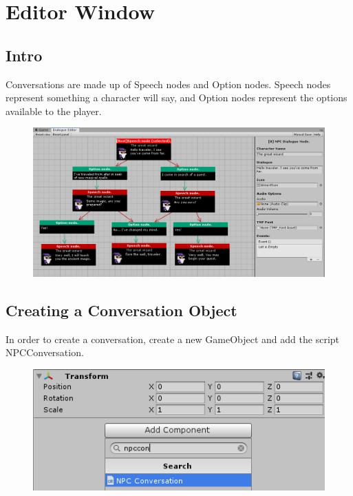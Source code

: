 \documentclass[a4paper,12pt]{article}
\begin{document}
\section{Editor Window}
\hypertarget{_editorwindow}{}

\subsection{Intro}
Conversations are made up of Speech nodes and Option nodes. Speech nodes represent something a character will say, and Option nodes represent the options available to the player.

\begin{figure}[ht]
\centering
\includegraphics[width=\textwidth,height=\textheight,keepaspectratio]{img/EditorWindowFullConversation.png}
\end{figure}


\subsection{Creating a Conversation Object}
In order to create a conversation, create a new GameObject and add the script NPCConversation. 

\begin{figure}[ht]
\centering
\includegraphics[keepaspectratio]{img/AddNpcConversation.png}
\end{figure}
\end{document}
